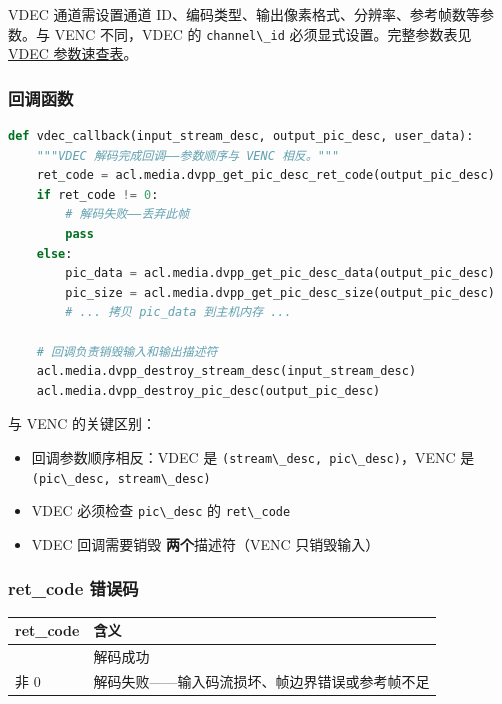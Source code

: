 VDEC 通道需设置通道
ID、编码类型、输出像素格式、分辨率、参考帧数等参数。与 VENC 不同，VDEC
的 \passthrough{\lstinline!channel\_id!} 必须显式设置。完整参数表见
\hyperref[vdec-params]{VDEC 参数速查表}。

\subsubsection{回调函数}\label{src-book-chapter6-h58}

\begin{lstlisting}[language=Python]
def vdec_callback(input_stream_desc, output_pic_desc, user_data):
    """VDEC 解码完成回调——参数顺序与 VENC 相反。"""
    ret_code = acl.media.dvpp_get_pic_desc_ret_code(output_pic_desc)
    if ret_code != 0:
        # 解码失败——丢弃此帧
        pass
    else:
        pic_data = acl.media.dvpp_get_pic_desc_data(output_pic_desc)
        pic_size = acl.media.dvpp_get_pic_desc_size(output_pic_desc)
        # ... 拷贝 pic_data 到主机内存 ...

    # 回调负责销毁输入和输出描述符
    acl.media.dvpp_destroy_stream_desc(input_stream_desc)
    acl.media.dvpp_destroy_pic_desc(output_pic_desc)
\end{lstlisting}

与 VENC 的关键区别：

\begin{itemize}
\tightlist
\item
  回调参数顺序相反：VDEC 是
  \passthrough{\lstinline!(stream\_desc, pic\_desc)!}，VENC 是
  \passthrough{\lstinline!(pic\_desc, stream\_desc)!}
\item
  VDEC 必须检查 \passthrough{\lstinline!pic\_desc!} 的
  \passthrough{\lstinline!ret\_code!}
\item
  VDEC 回调需要销毁 \textbf{两个}描述符（VENC 只销毁输入）
\end{itemize}

\subsubsection{ret\_code 错误码}\label{src-book-chapter6-h59}

\begin{longtable}[]{@{}ll@{}}
\toprule\noalign{}
ret\_code & 含义 \\
\midrule\noalign{}
\endhead
\bottomrule\noalign{}
\endlastfoot
0 & 解码成功 \\
非 0 & 解码失败------输入码流损坏、帧边界错误或参考帧不足 \\
\end{longtable}

